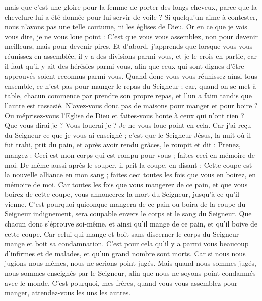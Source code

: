 \begin{multicols}{2}
mais que c’est une gloire pour la femme de porter des longs cheveux, parce que la chevelure lui a été donnée pour lui servir de voile ?
Si quelqu'un aime à contester, nous n'avons pas une telle coutume, ni les églises de Dieu.
Or en ce que je vais vous dire, je ne vous loue point : C’est que vous vous assemblez, non pour devenir meilleurs, mais pour devenir pires.
Et d’abord, j'apprends que lorsque vous vous réunissez en assemblée, il y a des divisions parmi vous, et je le crois en partie,
car il faut qu'il y ait des hérésies parmi vous, afin que ceux qui sont dignes d’être approuvés soient reconnus parmi vous.
Quand donc vous vous réunissez ainsi tous ensemble, ce n'est pas pour manger le repas du Seigneur ;
car, quand on se met à table, chacun commence par prendre son propre repas, et l'un a faim tandis que l'autre est rassasié.
N'avez-vous donc pas de maisons pour manger et pour boire ? Ou méprisez-vous l'Eglise de Dieu et faites-vous honte à ceux qui n'ont rien ? Que vous dirai-je ? Vous louerai-je ? Je ne vous loue point en cela.
Car j'ai reçu du Seigneur ce que je vous ai enseigné ; c’est que le Seigneur Jésus, la nuit où il fut trahi, prit du pain,
et après avoir rendu grâces, le rompit et dit : Prenez, mangez : Ceci est mon corps qui est rompu pour vous ; faites ceci en mémoire de moi.
De même aussi après le souper, il prit la coupe, en disant : Cette coupe est la nouvelle alliance en mon sang ; faites ceci toutes les fois que vous en boirez, en mémoire de moi.
Car toutes les fois que vous mangerez de ce pain, et que vous boirez de cette coupe, vous annoncerez la mort du Seigneur, jusqu’à ce qu'il vienne.
C'est pourquoi quiconque mangera de ce pain ou boira de la coupe du Seigneur indignement, sera coupable envers le corps et le sang du Seigneur.
Que chacun donc s'éprouve soi-même, et ainsi qu'il mange de ce pain, et qu'il boive de cette coupe.
Car celui qui mange et boit sans discerner le corps du Seigneur mange et boit sa condamnation.
C’est pour cela qu’il y a parmi vous beaucoup d’infirmes et de malades, et qu’un grand nombre sont morts.
Car si nous nous jugions nous-mêmes, nous ne serions point jugés.
Mais quand nous sommes jugés, nous sommes enseignés par le Seigneur, afin que nous ne soyons point condamnés avec le monde.
C'est pourquoi, mes frères, quand vous vous assemblez pour manger, attendez-vous les uns les autres.

\end{multicols}
